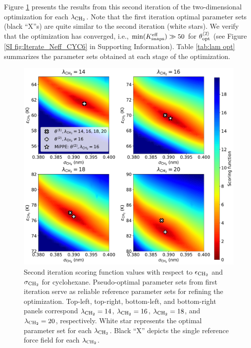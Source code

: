 \documentclass[journal=jced,manuscript=article]{achemso}
\begin{document}
Figure \ref{fig:Iterate_Score_CYC6} presents the results from this second iteration of the two-dimensional optimization for each $\lambda_{\rm CH_2}$. Note that the first iteration optimal parameter sets (black ``X''s) are quite similar to the second iteration (white stars). We verify that the optimization has converged, i.e., $\min(K_{\rm snaps}^{\rm eff}) \gg 50$ for $\theta_{\rm opt}^{\langle2\rangle}$ (see Figure \ref{SI fig:Iterate_Neff_CYC6} in Supporting Information). Table \ref{tab:lam opt} summarizes the parameter sets obtained at each stage of the optimization. 


	\begin{figure}[htb!]
		\centering
		\includegraphics[width=6.4in]{CYC6_scoring_function_lam_iteration.pdf}
		\caption{Second iteration scoring function values with respect to $\epsilon_{\rm CH_2}$ and $\sigma_{\rm CH_2}$ for cyclohexane. Pseudo-optimal parameter sets from first iteration serve as reliable reference parameter sets for refining the optimization. Top-left, top-right, bottom-left, and bottom-right panels correspond $\lambda_{\rm CH_2} = 14$, $\lambda_{\rm CH_2} = 16$, $\lambda_{\rm CH_2} = 18$, and $\lambda_{\rm CH_2} = 20$, respectively. White star represents the optimal parameter set for each $\lambda_{\rm CH_2}$. Black ``X'' depicts the single reference force field for each $\lambda_{\rm CH_2}$.} %
		\label{fig:Iterate_Score_CYC6}
	\end{figure} 
\end{document}
